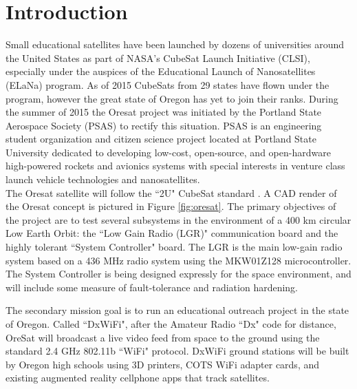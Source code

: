 \documentclass[]{aiaa-tc}%
\begin{document}
\section{Introduction}
Small educational satellites have been launched by dozens of universities around the United States as part of NASA’s CubeSat Launch Initiative (CLSI), especially under the auspices of the Educational Launch of Nanosatellites (ELaNa) program. As of 2015 CubeSats from 29 states have flown under the program, however the great state of Oregon has yet to join their ranks\cite{Mahoney:15bk}. During the summer of 2015 the Oresat project was initiated by the Portland State Aerospace Society (PSAS) to rectify this situation. PSAS is an engineering student organization and citizen science project located at Portland State University dedicated to developing low-cost, open-source, and open-hardware high-powered rockets and avionics systems with special interests in venture class launch vehicle technologies and nanosatellites\cite{PSAS:15bk}.\\

The Oresat satellite will follow the ``2U" CubeSat standard \cite{Cubesat:14bk}. A CAD render of the Oresat concept is pictured in Figure \ref{fig:oresat}. The primary objectives of the project are to test several subsystems in the environment of a 400 km circular Low Earth Orbit: the ``Low Gain Radio (LGR)" communication board and the highly tolerant ``System Controller" board. The LGR is the main low-gain radio system based on a 436 MHz radio system using the MKW01Z128 microcontroller. The System Controller is being designed expressly for the space environment, and will include some measure of fault-tolerance and radiation hardening.

The secondary mission goal is to run an educational outreach project in the state of Oregon. Called ``DxWiFi", after the Amateur Radio ``Dx" code for distance, OreSat will broadcast a live video feed from space to the ground using the standard 2.4 GHz  802.11b ``WiFi" protocol. DxWiFi ground stations will be built by Oregon high schools using 3D printers, COTS WiFi adapter cards, and existing augmented reality cellphone apps that track satellites.
\end{document}
